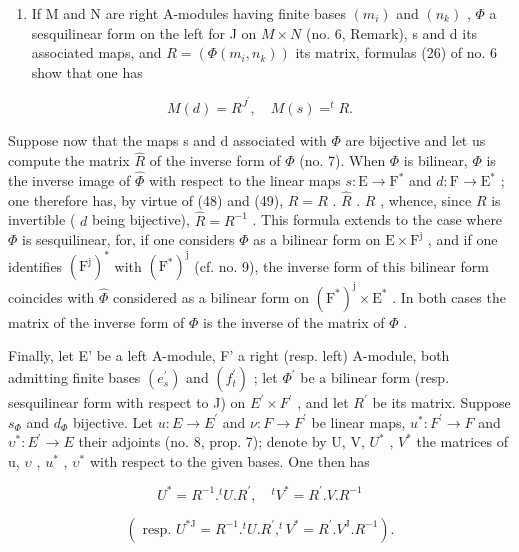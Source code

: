 \begin{enumerate}
\def\labelenumi{\arabic{enumi})}
\setcounter{enumi}{1}
\tightlist
\item
  If M and N are right A-modules having finite bases \((m_{i})\) and \((n_{k})\) , \(\Phi\) a sesquilinear form on the left for J on \(M \times N\) (no. 6, Remark), s and d its associated maps, and \(R = (\Phi(m_{i}, n_{k}))\) its matrix, formulas (26) of no. 6 show that one has
\end{enumerate}

\[
M (d) = R ^ {J ^ {\prime}}, \quad M (s) = ^ {t} R.
\]

Suppose now that the maps s and d associated with \(\Phi\) are bijective and let us compute the matrix \(\hat{R}\) of the inverse form of \(\Phi\) (no. 7). When \(\Phi\) is bilinear, \(\Phi\) is the inverse image of \(\hat{\Phi}\) with respect to the linear maps \(s: \mathrm{E} \to \mathrm{F}^*\) and \(d: \mathrm{F} \to \mathrm{E}^*\) ; one therefore has, by virtue of (48) and (49), \(R = R\) . \(\hat{R}\) . \(R\) , whence, since \(R\) is invertible ( \(d\) being bijective), \(\hat{R} = R^{-1}\) . This formula extends to the case where \(\Phi\) is sesquilinear, for, if one considers \(\Phi\) as a bilinear form on \(\mathrm{E} \times \mathrm{F}^{\mathrm{j}}\) , and if one identifies \((\mathrm{F}^{\mathrm{j}})^{*}\) with \((\mathrm{F}^{*})^{\mathrm{j}}\) (cf. no. 9), the inverse form of this bilinear form coincides with \(\hat{\Phi}\) considered as a bilinear form on \((\mathrm{F}^{*})^{\mathrm{j}} \times \mathrm{E}^{*}\) . In both cases the matrix of the inverse form of \(\Phi\) is the inverse of the matrix of \(\Phi\) .

Finally, let E' be a left A-module, F' a right (resp. left) A-module, both admitting finite bases \((e_{s}^{\prime})\) and \((f_{t}^{\prime})\) ; let \(\Phi^{\prime}\) be a bilinear form (resp. sesquilinear form with respect to J) on \(E^{\prime} \times F^{\prime}\) , and let \(R^{\prime}\) be its matrix. Suppose \(s_{\Phi}\) and \(d_{\Phi}\) bijective. Let \(u : E \to E^{\prime}\) and \(\nu : F \to F^{\prime}\) be linear maps, \(u^{*} : F^{\prime} \to F\) and \(\upsilon^{*} : E^{\prime} \to E\) their adjoints (no. 8, prop. 7); denote by U, V, \(U^{*}\) , \(V^{*}\) the matrices of u, \(\upsilon\) , \(u^{*}\) , \(\upsilon^{*}\) with respect to the given bases. One then has

\[
U ^ {*} = R ^ {- 1}. ^ {t} U. R ^ {\prime}, \quad {} ^ {t} V ^ {*} = R ^ {\prime}. V. R ^ {- 1}\tag{50}
\]

\[
(\text { resp. } U ^ {* \mathrm{J}} = R ^ {- 1}. ^ {t} U. R ^ {\prime}, ^ {t} V ^ {*} = R ^ {\prime}. V ^ {\mathrm{J}}. R ^ {- 1}).
\]

